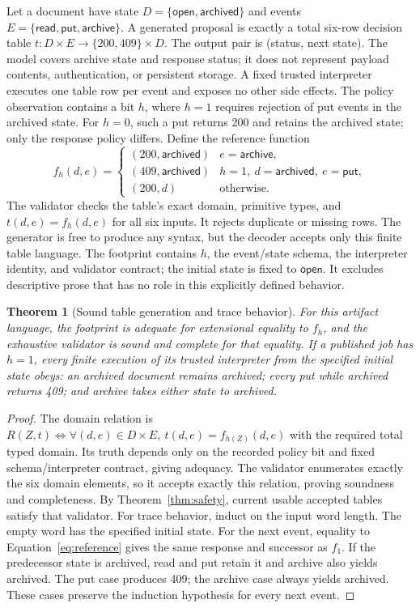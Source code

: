 \documentclass[pdflatex,sn-mathphys-num]{sn-jnl}
\theoremstyle{thmstyleone}
\newtheorem{theorem}{Theorem}
\theoremstyle{thmstylethree}
\theoremstyle{thmstyletwo}
\begin{document}
Let a document have state $D=\{\mathsf{open},\mathsf{archived}\}$ and events $E=\{\mathsf{read},\mathsf{put},\mathsf{archive}\}$. A generated proposal is exactly a total six-row decision table $t:D\times E\to\{200,409\}\times D$. The output pair is (status, next state). The model covers archive state and response status; it does not represent payload contents, authentication, or persistent storage. A fixed trusted interpreter executes one table row per event and exposes no other side effects. The policy observation contains a bit $h$, where $h=1$ requires rejection of put events in the archived state. For $h=0$, such a put returns 200 and retains the archived state; only the response policy differs. Define the reference function
\begin{equation}\label{eq:reference}
f_h(d,e)=\begin{cases}
(200,\mathsf{archived}) & e=\mathsf{archive},\\
(409,\mathsf{archived}) & h=1,\ d=\mathsf{archived},\ e=\mathsf{put},\\
(200,d) & \text{otherwise}.
\end{cases}
\end{equation}
The validator checks the table's exact domain, primitive types, and $t(d,e)=f_h(d,e)$ for all six inputs. It rejects duplicate or missing rows. The generator is free to produce any syntax, but the decoder accepts only this finite table language. The footprint contains $h$, the event/state schema, the interpreter identity, and validator contract; the initial state is fixed to $\mathsf{open}$. It excludes descriptive prose that has no role in this explicitly defined behavior.

\begin{theorem}[Sound table generation and trace behavior]\label{thm:table}
For this artifact language, the footprint is adequate for extensional equality to $f_h$, and the exhaustive validator is sound and complete for that equality. If a published job has $h=1$, every finite execution of its trusted interpreter from the specified initial state obeys: an archived document remains archived; every put while archived returns 409; and archive takes either state to archived.
\end{theorem}
\begin{proof}
The domain relation is $R(Z,t)\iff\forall(d,e)\in D\times E,\ t(d,e)=f_{h(Z)}(d,e)$ with the required total typed domain. Its truth depends only on the recorded policy bit and fixed schema/interpreter contract, giving adequacy. The validator enumerates exactly the six domain elements, so it accepts exactly this relation, proving soundness and completeness. By Theorem~\ref{thm:safety}, current usable accepted tables satisfy that validator. For trace behavior, induct on the input word length. The empty word has the specified initial state. For the next event, equality to Equation~\eqref{eq:reference} gives the same response and successor as $f_1$. If the predecessor state is archived, read and put retain it and archive also yields archived. The put case produces 409; the archive case always yields archived. These cases preserve the induction hypothesis for every next event.\qedhere
\end{proof}
\end{document}

